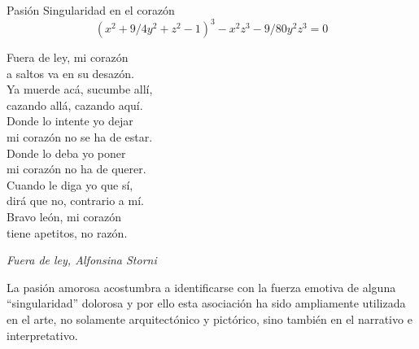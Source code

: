 \begin{surferPage}{Pasi\'on}
Singularidad en el coraz\'on\\
\smallskip
\[(x^2+ 9/4y^2	+ z^2- 1)^3- x^2z^3	- 9/80y^2z^3	= 0\]

\singlespacing
Fuera de ley, mi coraz\'on\\a saltos va en su desaz\'on.\\
\vspace{0.3cm}
Ya muerde ac\'a, sucumbe all\'i,\\cazando all\'a, cazando aqu\'i.\\
\vspace{0.3cm}
Donde lo intente yo dejar\\mi coraz\'on no se ha de estar.\\
\vspace{0.3cm}
Donde lo deba yo poner\\mi coraz\'on no ha de querer.\\
\vspace{0.3cm}
Cuando le diga yo que s\'i,\\dir\'a que no, contrario a m\'i.\\
\vspace{0.3cm}
Bravo le\'on, mi coraz\'on\\tiene apetitos, no raz\'on.

\begin{flushright}
{\it Fuera de ley, Alfonsina Storni}
\end{flushright}

\singlespacing 
La pasi\'on amorosa acostumbra a identificarse con la fuerza emotiva de alguna ``singularidad'' dolorosa y por ello esta asociaci\'on ha sido ampliamente utilizada en el arte, no solamente arquitect\'onico y pict\'orico, sino tambi\'en en el narrativo e interpretativo.
\end{surferPage}
